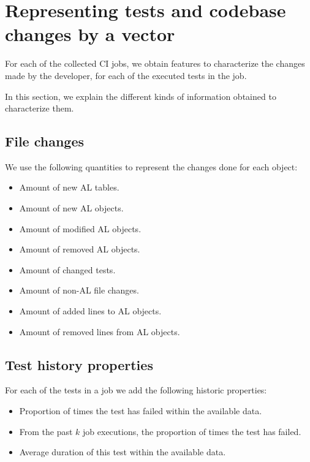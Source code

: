 \section{Representing tests and codebase changes by a vector}\label{s:method-characterizing-testruns}

For each of the collected CI jobs, we obtain features to characterize
the changes made by the developer, for each of the executed tests in the job.

In this section, we explain the different kinds of information obtained to
characterize them.

\subsection{File changes}

We use the following quantities to represent the changes done for each object:

\begin{itemize}
    \item Amount of new AL tables.
    \item Amount of new AL objects.
    \item Amount of modified AL objects.
    \item Amount of removed AL objects.
    \item Amount of changed tests.
    \item Amount of non-AL file changes.
    \item Amount of added lines to AL objects.
    \item Amount of removed lines from AL objects.
\end{itemize}

\subsection{Test history properties}

For each of the tests in a job we add the following historic properties:

\begin{itemize}
    \item Proportion of times the test has failed within the available data.
    \item From the past $k$ job executions, the proportion of times the test has failed.
    \item Average duration of this test within the available data.
\end{itemize}

